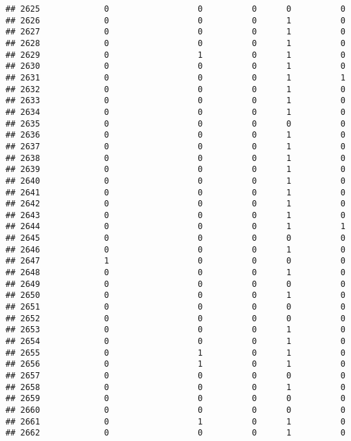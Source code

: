 \documentclass[
]{article}
\begin{document}
\begin{verbatim}
## 2625             0                  0          0      0          0
## 2626             0                  0          0      1          0
## 2627             0                  0          0      1          0
## 2628             0                  0          0      1          0
## 2629             0                  1          0      1          0
## 2630             0                  0          0      1          0
## 2631             0                  0          0      1          1
## 2632             0                  0          0      1          0
## 2633             0                  0          0      1          0
## 2634             0                  0          0      1          0
## 2635             0                  0          0      0          0
## 2636             0                  0          0      1          0
## 2637             0                  0          0      1          0
## 2638             0                  0          0      1          0
## 2639             0                  0          0      1          0
## 2640             0                  0          0      1          0
## 2641             0                  0          0      1          0
## 2642             0                  0          0      1          0
## 2643             0                  0          0      1          0
## 2644             0                  0          0      1          1
## 2645             0                  0          0      0          0
## 2646             0                  0          0      1          0
## 2647             1                  0          0      0          0
## 2648             0                  0          0      1          0
## 2649             0                  0          0      0          0
## 2650             0                  0          0      1          0
## 2651             0                  0          0      0          0
## 2652             0                  0          0      0          0
## 2653             0                  0          0      1          0
## 2654             0                  0          0      1          0
## 2655             0                  1          0      1          0
## 2656             0                  1          0      1          0
## 2657             0                  0          0      0          0
## 2658             0                  0          0      1          0
## 2659             0                  0          0      0          0
## 2660             0                  0          0      0          0
## 2661             0                  1          0      1          0
## 2662             0                  0          0      1          0

\end{verbatim}
\end{document}
